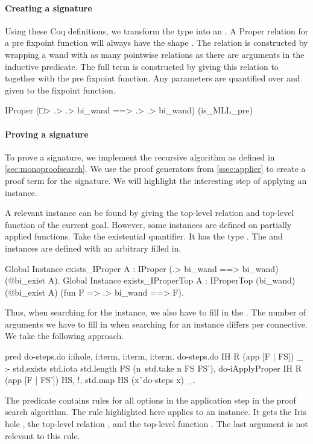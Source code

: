 \documentclass[thesis.tex]{subfiles}
\begin{document}
\paragraph{Creating a signature}
Using these Coq definitions, we transform the type into an . A Proper relation for a pre fixpoint function will always have the shape . The relation  is constructed by wrapping a wand with as many pointwise relations as there are arguments in the inductive predicate. The full  term is constructed by giving this relation to  together with the pre fixpoint function. Any parameters are quantified over and given to the fixpoint function.
\begin{coqcode}
  IProper (□> .> .> bi_wand ==> .> .> bi_wand) 
          (is_MLL_pre)
\end{coqcode}

\paragraph{Proving a signature}
To prove a signature, we implement the recursive algorithm as defined in \cref{sec:monoproofsearch}. We use the proof generators from \cref{ssec:applier} to create a proof term for the signature. We will highlight the interesting step of applying an  instance.

A relevant  instance can be found by giving the top-level relation and top-level function of the current goal. However, some  instances are defined on partially applied functions. Take the existential quantifier. It has the type . The  and  instances are defined with an arbitrary  filled in.
\begin{coqcode}
  Global Instance exists_IProper {A} : 
    IProper (.> bi_wand ==> bi_wand) 
            (@bi_exist A).
  Global Instance exists_IProperTop {A} : 
    IProperTop (bi_wand) (@bi_exist A) 
               (fun F => .> bi_wand ==> F).
\end{coqcode}
Thus, when searching for the instance, we also have to fill in the . The number of arguments we have to fill in when searching for an  instance differs per connective. We take the following approach.
\begin{elpicode}
  pred do-steps.do i:ihole, i:term, i:term, i:term.
  do-steps.do IH R (app [F | FS]) _ :- 
    std.exists { std.iota {std.length FS} } 
               (n\ std.take n FS FS'),
    do-iApplyProper IH R (app [F | FS']) HS, !,
    std.map HS (x\r\ do-steps x) _.
\end{elpicode}
The  predicate contains rules for all options in the application step in the proof search algorithm. The rule highlighted here applies to an  instance. It gets the Iris hole , the top-level relation , and the top-level function . The last argument is not relevant to this rule.
\end{document}
